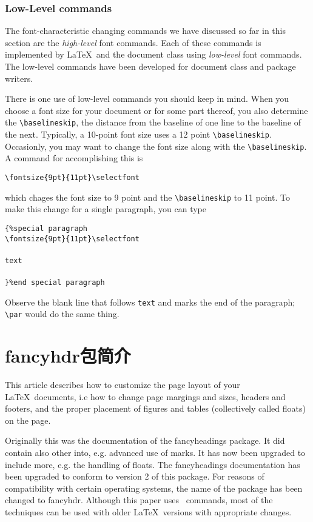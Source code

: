 \documentclass{dutrep}
\newcommand{\tbs}{\textbackslash}
\begin{document}
	\lipsum[2-10]
	\subsection{Low-Level commands}
	The font-characteristic changing commands we have discussed so far in this section are the \emph{high-level} font commands. Each of these commands is implemented by \LaTeX\ and the document class using \emph{low-level} font commands. The low-level commands have been developed for document class and package writers.

	There is one use of low-level commands you should keep in mind. When you choose a font size for your document or for some part thereof, you also determine the \texttt{\textbackslash baselineskip}, the distance from the baseline of one line to the baseline of the next. Typically, a 10-point font size uses a 12 point \texttt{\textbackslash baselineskip}.  Occasionly, you may want to change the font size along with the \texttt{\textbackslash baselineskip}. A command for accomplishing this is

	\noindent\texttt{\tbs fontsize\{9pt\}\{11pt\}\textbackslash selectfont}

	which chages the font size to 9 point and the \texttt{\tbs baselineskip} to 11 point. To make this change for a single paragraph, you can type

	\texttt{\{\%special paragraph\\
	\tbs fontsize\{9pt\}\{11pt\}\tbs selectfont\\
	\\
	text\\
	\\
	\}\%end special paragraph}

	Observe the blank line that follows \texttt{text} and marks the end of the paragraph; \texttt{\tbs par} would do the same thing.

	\chapter{\textsf{fancyhdr}包简介}
	This article describes how to customize the page layout of your \LaTeX\ documents, i.e how to change page margings and sizes, headers and footers, and the proper placement of figures and tables (collectively called floats) on the page.

	Originally this was the documentation of the \textsf{fancyheadings} package. It did contain also other into, e.g. advanced use of marks. It has now been upgraded to include more, e.g. the handling of floats. The fancyheadings documentation has been upgraded to conform to version 2 of this package. For reasons of compatibility with certain operating systems, the name of the package has been changed to \textsf{fancyhdr}. Although this paper uses \LaTeXe\ commands, most of the techniques can be used with older \LaTeX\ versions with appropriate changes.
\end{document}
